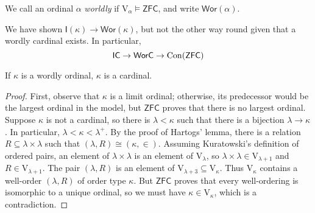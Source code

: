 \begin{definition}
    We call an ordinal \( \alpha \) \emph{worldly} if \( \mathrm{V}_\alpha \vDash \mathsf{ZFC} \), and write \( \mathsf{Wor}(\alpha) \).
\end{definition}
We have shown \( \mathsf{I}(\kappa) \to \mathsf{Wor}(\kappa) \), but not the other way round given that a wordly cardinal exists.
In particular,
\[ \mathsf{IC} \to \mathsf{WorC} \to \operatorname{Con}(\mathsf{ZFC}) \]
\begin{theorem}
    If \( \kappa \) is a wordly ordinal, \( \kappa \) is a cardinal.
\end{theorem}
\begin{proof}
    First, observe that \( \kappa \) is a limit ordinal; otherwise, its predecessor would be the largest ordinal in the model, but \( \mathsf{ZFC} \) proves that there is no largest ordinal.
    Suppose \( \kappa \) is not a cardinal, so there is \( \lambda < \kappa \) such that there is a bijection \( \lambda \to \kappa \).
    In particular, \( \lambda < \kappa < \lambda^+ \).
    By the proof of Hartogs' lemma, there is a relation \( R \subseteq \lambda \times \lambda \) such that \( (\lambda, R) \cong (\kappa, \in) \).
    Assuming Kuratowski's definition of ordered pairs, an element of \( \lambda \times \lambda \) is an element of \( \mathrm{V}_{\lambda} \), so \( \lambda \times \lambda \in \mathrm{V}_{\lambda + 1} \) and \( R \in \mathrm{V}_{\lambda + 1} \).
    The pair \( (\lambda, R) \) is an element of \( \mathrm{V}_{\lambda + 3} \subseteq \mathrm{V}_{\kappa} \).
    Thus \( \mathrm{V}_\kappa \) contains a well-order \( (\lambda, R) \) of order type \( \kappa \).
    But \( \mathsf{ZFC} \) proves that every well-ordering is isomorphic to a unique ordinal, so we must have \( \kappa \in \mathrm{V}_\kappa \), which is a contradiction.
\end{proof}

